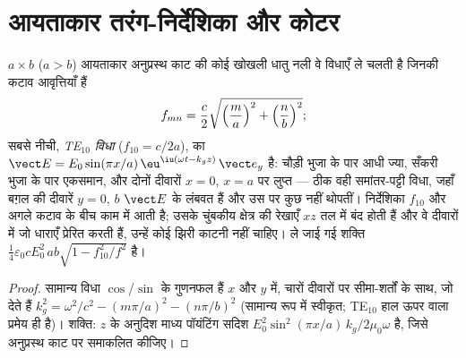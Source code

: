 \section{आयताकार तरंग-निर्देशिका और कोटर}

\begin{proposition}[आयताकार निर्देशिका; TE$_{10}$ विधा]\label{prop:b2:guided-waves:rectangular}
$a \times b$ ($a > b$) आयताकार अनुप्रस्थ काट की कोई खोखली धातु नली वे
विधाएँ ले चलती है जिनकी कटाव आवृत्तियाँ हैं
\[
f_{mn} = \frac c2\sqrt{\Bigl(\frac ma\Bigr)^2 + \Bigl(\frac nb\Bigr)^2} ;
\]
सबसे नीची, \emph{TE$_{10}$ विधा} ($f_{10} = c/2a$), का $\vect E = E_0\sin
(\pi x/a)\,\eu^{\iu(\omega t - k_gz)}\,\vect e_y$ है: चौड़ी भुजा के पार आधी ज्या,
सँकरी भुजा के पार एकसमान, और दोनों दीवारों $x = 0$,
$x = a$ पर लुप्त --- ठीक वही समांतर-पट्टी विधा, जहाँ बग़ल की दीवारें $y = 0$, $b$
$\vect E$ के लंबवत हैं और उस पर कुछ नहीं थोपतीं। निर्देशिका
$f_{10}$ और अगले कटाव के बीच काम में आती है; उसके चुंबकीय क्षेत्र की रेखाएँ
$xz$ तल में बंद होती हैं और वे दीवारों में जो धाराएँ प्रेरित करती हैं, उन्हें
कोई झिरी काटनी नहीं चाहिए। ले जाई गई शक्ति $\tfrac14\varepsilon_0cE_0^2\,ab
\sqrt{1 - f_{10}^2/f^2}$ है।
\end{proposition}

\begin{proof}
सामान्य विधा $\cos$/$\sin$ के गुणनफल हैं $x$ और $y$ में, चारों दीवारों पर
सीमा-शर्तों के साथ, जो देते हैं $k_g^2 = \omega^2/c^2 - (m\pi/a)^2
- (n\pi/b)^2$ (सामान्य रूप में स्वीकृत; TE$_{10}$ हाल ऊपर वाला
प्रमेय ही है)। शक्ति: $z$ के अनुदिश माध्य पॉयंटिंग सदिश $E_0^2\sin^2(\pi x/a)
\,k_g/2\mu_0\omega$ है, जिसे अनुप्रस्थ काट पर समाकलित कीजिए।
\end{proof}

